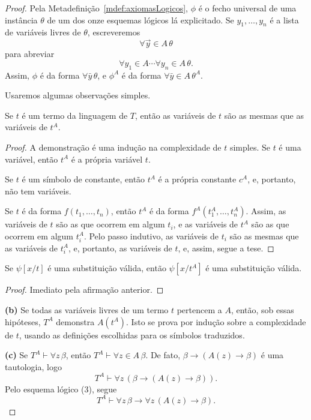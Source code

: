 \begin{proof}
    Pela Metadefinição~\ref{mdef:axiomasLogicos}, $\phi$ é o fecho universal de uma instância $\theta$ de um dos onze esquemas lógicos lá explicitado.
    Se $y_1, \dots, y_n$ é a lista de variáveis livres de $\theta$, escreveremos
    \[
        \forall \vec y \in A\, \theta
    \]
    para abreviar
    \[
        \forall y_1\in A \cdots \forall y_n \in A\, \theta.
    \]
    Assim, $\phi$ é da forma $\forall \bar y\, \theta$, e $\phi^A$ é da forma $\forall \bar y\in A\, \theta^A$.

    Usaremos algumas observações simples.

    \begin{claim}
        Se $t$ é um termo da linguagem de $T$, então as variáveis de $t$ são as mesmas que as variáveis de $t^A$.
    \end{claim}
    \begin{proof}
        A demonstração é uma indução na complexidade de $t$ simples.
        Se $t$ é uma variável, então $t^A$ é a própria variável $t$.

        Se $t$ é um símbolo de constante, então $t^A$ é a própria constante $c^A$, e, portanto, não tem variáveis.

        Se $t$ é da forma $f(t_1, \dots, t_n)$, então $t^A$ é da forma $f^A(t_1^A, \dots, t_n^A)$.
        Assim, as variáveis de $t$ são as que ocorrem em algum $t_i$, e as variáveis de $t^A$ são as que ocorrem em algum $t_i^A$.
        Pelo passo indutivo, as variáveis de $t_i$ são as mesmas que as variáveis de $t_i^A$, e, portanto, as variáveis de $t$, e, assim, segue a tese.
    \end{proof}

    \begin{claim}
        Se $\psi[x/t]$ é uma substituição válida, então $\psi[x/t^A]$ é uma substituição válida.
    \end{claim}
    \begin{proof}
        Imediato pela afirmação anterior.
    \end{proof}

    \smallskip
    \textbf{(b)} Se todas as variáveis livres de um termo $t$ pertencem a $A$, então, sob essas hipóteses,
    $T^A$ demonstra $A(t^A)$.
    Isto se prova por indução sobre a complexidade de $t$, usando as definições escolhidas para os símbolos traduzidos.

    \smallskip
    \textbf{(c)} Se $T^A\vdash \forall z\,\beta$, então $T^A\vdash \forall z\in A\,\beta$.
    De fato, $\beta\rightarrow (A(z)\rightarrow \beta)$ é uma tautologia, logo
    \[
        T^A\vdash \forall z\,(\beta\rightarrow (A(z)\rightarrow \beta)).
    \]
    Pelo esquema lógico (3), segue
    \[
        T^A\vdash \forall z\,\beta \rightarrow \forall z\,(A(z)\rightarrow \beta).
    \]


\end{proof}
